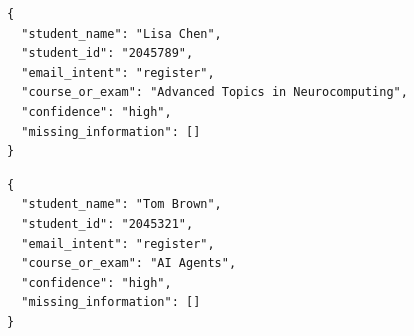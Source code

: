 \documentclass[11pt,a4paper]{article}
\begin{document}
\begin{lstlisting}[caption={Email 4 -- Ambiguous intent}]
{
  "student_name": "Lisa Chen",
  "student_id": "2045789",
  "email_intent": "register",
  "course_or_exam": "Advanced Topics in Neurocomputing",
  "confidence": "high",
  "missing_information": []
}
\end{lstlisting}

\begin{lstlisting}[caption={Email 5 -- Extra irrelevant information}]
{
  "student_name": "Tom Brown",
  "student_id": "2045321",
  "email_intent": "register",
  "course_or_exam": "AI Agents",
  "confidence": "high",
  "missing_information": []
}
\end{lstlisting}
\end{document}
